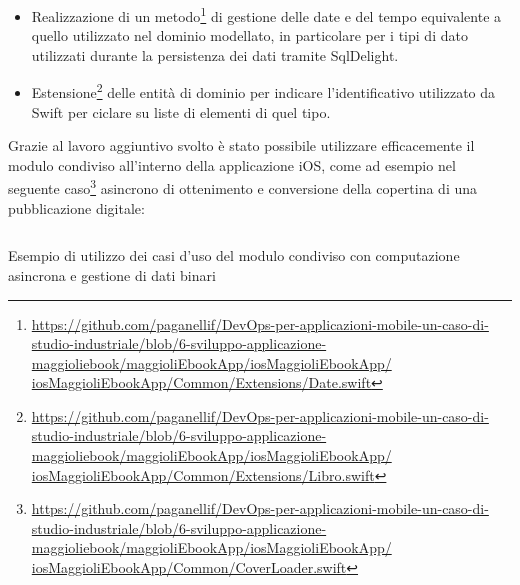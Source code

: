 \begin{itemize}
    \item Realizzazione di un metodo\footnote{\href{https://github.com/paganellif/DevOps-per-applicazioni-mobile-un-caso-di-studio-industriale/blob/6-sviluppo-applicazione-maggioliebook/maggioliEbookApp/iosMaggioliEbookApp/iosMaggioliEbookApp/Common/Extensions/Date.swift}{https://github.com/paganellif/DevOps-per-applicazioni-mobile-un-caso-di-studio-industriale/blob/6-sviluppo-applicazione-maggioliebook/maggioliEbookApp/iosMaggioliEbookApp/\\iosMaggioliEbookApp/Common/Extensions/Date.swift}} di gestione delle date e del tempo equivalente a quello utilizzato nel dominio modellato, in particolare per i tipi di dato utilizzati durante la persistenza dei dati tramite SqlDelight.
    \item Estensione\footnote{\href{https://github.com/paganellif/DevOps-per-applicazioni-mobile-un-caso-di-studio-industriale/blob/6-sviluppo-applicazione-maggioliebook/maggioliEbookApp/iosMaggioliEbookApp/iosMaggioliEbookApp/Common/Extensions/Libro.swift}{https://github.com/paganellif/DevOps-per-applicazioni-mobile-un-caso-di-studio-industriale/blob/6-sviluppo-applicazione-maggioliebook/maggioliEbookApp/iosMaggioliEbookApp/\\iosMaggioliEbookApp/Common/Extensions/Libro.swift}} delle entità di dominio per indicare l'identificativo utilizzato da Swift per ciclare su liste di elementi di quel tipo.
\end{itemize}

Grazie al lavoro aggiuntivo svolto è stato possibile utilizzare efficacemente il modulo condiviso all'interno della applicazione iOS, come ad esempio nel seguente caso\footnote{\href{https://github.com/paganellif/DevOps-per-applicazioni-mobile-un-caso-di-studio-industriale/blob/6-sviluppo-applicazione-maggioliebook/maggioliEbookApp/iosMaggioliEbookApp/iosMaggioliEbookApp/Common/CoverLoader.swift}{https://github.com/paganellif/DevOps-per-applicazioni-mobile-un-caso-di-studio-industriale/blob/6-sviluppo-applicazione-maggioliebook/maggioliEbookApp/iosMaggioliEbookApp/\\iosMaggioliEbookApp/Common/CoverLoader.swift}} asincrono di ottenimento e conversione della copertina di una pubblicazione digitale:

\begin{listing}[H]
    \inputminted{swift}{code/CoverLoader.swift}
    \caption{Esempio di utilizzo dei casi d'uso del modulo condiviso con computazione asincrona e gestione di dati binari}
\end{listing}


